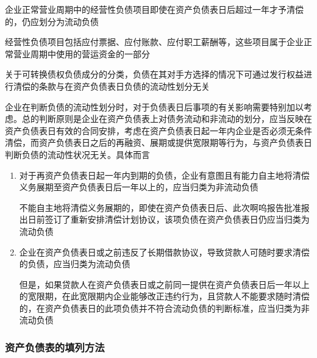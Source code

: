 \documentclass[UTF8,12pt]{ctexart}
\numberwithin{equation}{section} %
\numberwithin{figure}{section}
\numberwithin{table}{section}
\begin{document}
	企业正常营业周期中的经营性负债项目即使在资产负债表日后超过一年才予清偿的，仍应划分为流动负债
	
	经营性负债项目包括应付票据、应付账款、应付职工薪酬等，这些项目属于企业正常营业周期中使用的营运资金的一部分
	
	关于可转换债权负债成分的分类，负债在其对手方选择的情况下可通过发行权益进行清偿的条款与在资产负债表日负债的流动性划分无关
	
	企业在判断负债的流动性划分时，对于负债表日后事项的有关影响需要特别加以考虑。总的判断原则是企业在资产负债表上对债务流动和非流动的划分，应当反映在资产负债表日有效的合同安排，考虑在资产负债表日起一年内企业是否必须无条件清偿，而资产负债表日之后的再融资、展期或提供宽限期等行为，与资产负债表日判断负债的流动性状况无关。具体而言
	\begin{enumerate}
		\item 对于再资产负债表日起一年内到期的负债，企业有意图且有能力自主地将清偿义务展期至资产负债表日后一年以上的，应当归类为非流动负债
		
		不能自主地将清偿义务展期的，即使在资产负债表日后、此次啊呜报告批准报出日前签订了重新安排清偿计划协议，该项负债在资产负债表日仍应当归类为流动负债
		
		\item 企业在资产负债表日或之前违反了长期借款协议，导致贷款人可随时要求清偿的负债，应当归类为流动负债
		
		但是，如果贷款人在资产负债表日或之前同一提供在资产负债表日后一年以上的宽限期，在此宽限期内企业能够改正违约行为，且贷款人不能要求随时清偿的，在资产负债表日的此项负债并不符合流动负债的判断标准，应当归类为非流动负债
	\end{enumerate}
	
	\subsubsection{资产负债表的填列方法}
\end{document}
